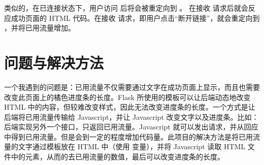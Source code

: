 类似的，在已连接状态下，用户访问  后将会被重定向到 。 在接收  请求后就会反应成功页面的 HTML 代码。在接收  请求，即用户点击“断开链接”，就会重定向到 ，并将已用流量增加。

\section{问题与解决方法}

一个我遇到的问题是：已用流量不仅需要通过文字在成功页面上显示，而且也需要改变此页面上的橘色进度条的长度。Flask 所使用的模板可以让后端动态地改变 HTML 中的内容，但较难改变样式，因此无法改变进度条的长度。一个方式是让后端将已用流量传输给 Javascript，并让 Javascript 改变文字以及进度条。比如：后端实现另外一个接口，只返回已用流量。Javascript 就可以发出请求，并从回应中得到已用流量。但是会到一定的程度增加代码量。此项目的解决方法是将已用流量的文字通过模板放在 HTML 中（使用  变量），并将 Javascript 读取 HTML 文件中的元素，从而的去已用流量的数值，最后可以改变进度条的长度。